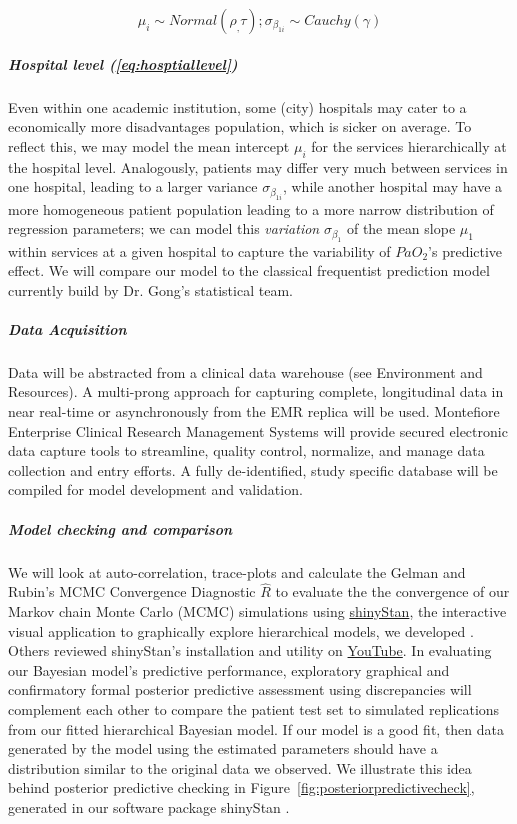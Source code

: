 \documentclass[11pt,notitlepage]{article}
\begin{document}
\begin{figure}
\vspace{-10pt}
\begin{equation} \label{eq:hosptiallevel}
 \mu_i \sim Normal(\rho_, \tau); \sigma_{\beta_{1i}} \sim Cauchy(\gamma)
\end{equation}
\vspace{-25pt}
\end{figure}

\subparagraph*{Hospital level (\ref{eq:hosptiallevel})}
Even within one academic institution, some (city) hospitals may cater to a economically more disadvantages population, which is sicker on average. To reflect this, we may  model the mean intercept $\mu_i$ for the services hierarchically at the hospital level. Analogously, patients may differ very much between services in one hospital, leading to a larger variance $\sigma_{\beta_{1i}}$, while another hospital may have a more homogeneous patient population leading to a more narrow distribution of regression parameters; we can model this \textit{variation} $\sigma_{\beta_1}$ of the mean slope $\mu_1$ within services at a given hospital to capture the variability of $PaO_2$'s predictive effect. We will compare our model to the classical frequentist prediction model currently build by Dr. Gong's statistical team.

\subparagraph*{Data Acquisition}
Data will be abstracted from a clinical data warehouse (see Environment and Resources). A multi-prong approach for capturing complete, longitudinal data in near real-time or asynchronously from the EMR replica will be used. Montefiore Enterprise Clinical Research Management Systems will provide secured electronic data capture tools to streamline, quality control, normalize, and manage data collection and entry efforts. A fully de-identified, study specific database will be compiled for model development and validation.

\subparagraph*{Model checking and comparison}
We will look at auto-correlation, trace-plots and calculate the Gelman and Rubin's MCMC Convergence Diagnostic $ \hat{R}$ to evaluate the the convergence of our Markov chain Monte Carlo (MCMC) simulations using \href{http://andrewgelman.com/2015/03/02/introducing-shinystan/}{shinyStan}, the interactive visual application to graphically explore hierarchical models, we developed \cite{shinystan-software:2015}. Others reviewed shinyStan's installation and utility on \href{https://www.youtube.com/watch?v=X31xqNHcvQs}{YouTube}. In evaluating our Bayesian model's predictive performance, exploratory graphical \cite{Gelman2004posteriorpredictivechecks} and confirmatory formal posterior predictive assessment using discrepancies \cite{GelmanMengStern1996} will complement each other to compare the patient test set to simulated replications from our fitted hierarchical Bayesian model. If our model is a good fit, then data generated by the model using the estimated parameters should have a distribution similar to the original data we observed. We illustrate this idea behind posterior predictive checking \cite{Gelman_predictive_2000} in Figure~\ref{fig:posteriorpredictivecheck}, generated in our software package shinyStan \cite{shinystan-software:2015}.
\end{document}
